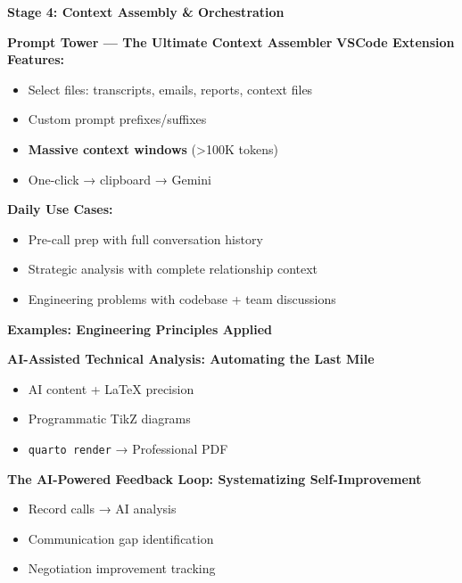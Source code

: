\documentclass[
  ignorenonframetext,
  aspectratio=169,
]{beamer}
\providecommand{\tightlist}{%
  \setlength{\itemsep}{0pt}\setlength{\parskip}{0pt}}
\begin{document}
\begin{frame}{\textbf{Stage 4: Context Assembly \& Orchestration}}
\label{stage-4-context-assembly-orchestration}
\begin{block}{\textbf{Prompt Tower --- The Ultimate Context Assembler}}
\label{prompt-tower-the-ultimate-context-assembler}
\textbf{VSCode Extension Features:}

\begin{itemize}
\tightlist
\item
  Select files: transcripts, emails, reports, context files
\item
  Custom prompt prefixes/suffixes
\item
  \textbf{Massive context windows} (\textgreater100K tokens)
\item
  One-click → clipboard → Gemini
\end{itemize}

\textbf{Daily Use Cases:}

\begin{itemize}
\tightlist
\item
  Pre-call prep with full conversation history
\item
  Strategic analysis with complete relationship context
\item
  Engineering problems with codebase + team discussions
\end{itemize}
\end{block}
\end{frame}

\begin{frame}[fragile]{\textbf{Examples: Engineering Principles
Applied}}
\label{examples-engineering-principles-applied}
\begin{block}{\textbf{AI-Assisted Technical Analysis: Automating the
Last Mile}}
\label{ai-assisted-technical-analysis-automating-the-last-mile}
\begin{itemize}
\tightlist
\item
  AI content + LaTeX precision
\item
  Programmatic TikZ diagrams
\item
  \texttt{quarto\ render} → Professional PDF
\end{itemize}
\end{block}
\end{frame}

\begin{frame}
\begin{block}{\textbf{The AI-Powered Feedback Loop: Systematizing
Self-Improvement}}
\label{the-ai-powered-feedback-loop-systematizing-self-improvement}
\begin{itemize}
\tightlist
\item
  Record calls → AI analysis
\item
  Communication gap identification
\item
  Negotiation improvement tracking
\end{itemize}
\end{block}
\end{frame}
\end{document}
